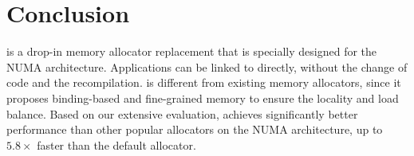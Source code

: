 \section{Conclusion}
\label{sec:conclusion}

\NM{} is a drop-in memory allocator replacement that is specially designed for the NUMA architecture. Applications can be linked to \NM{} directly, without the change of code and the recompilation. \NM{} is different from existing memory allocators, since it proposes binding-based and fine-grained memory to ensure the locality and load balance. 
Based on our extensive evaluation, \NM{} achieves significantly better performance than other popular allocators on the NUMA architecture, up to $5.8\times$ faster than the default allocator.  
